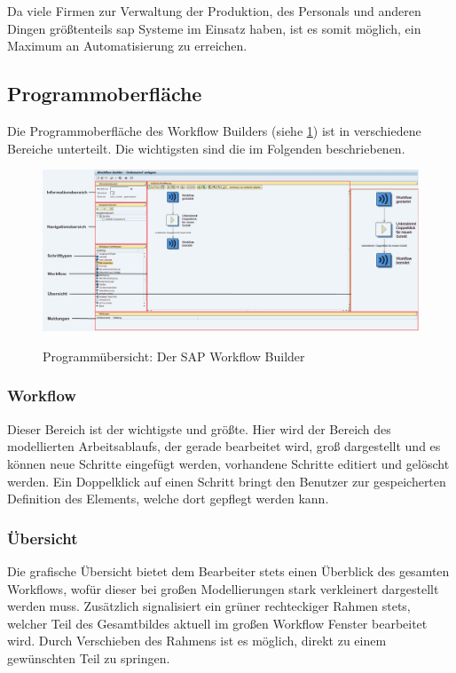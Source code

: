 Da viele Firmen zur Verwaltung der Produktion, des Personals und anderen Dingen größtenteils \gls{sap} Systeme im Einsatz haben, ist es somit möglich, ein Maximum an Automatisierung zu erreichen.

\subsection{Programmoberfläche}
\label{sec:win-overwiev}
Die Programmoberfläche des Workflow Builders (siehe \ref{abb:workflow-overview}) ist in verschiedene Bereiche unterteilt. Die wichtigsten sind die im Folgenden beschriebenen.

\begin{figure}[h]
	\begin{center}
	\includegraphics[width=1.0\textwidth]{grafiken/wf-builder_overview.png}
	\caption{Programmübersicht: Der SAP Workflow Builder}
	\vspace{-10pt}
	\label{abb:workflow-overview}
	\end{center}
\end{figure}

\subsubsection{Workflow}
\label{sec:win-overview-wf}
Dieser Bereich ist der wichtigste und größte. Hier wird der Bereich des modellierten Arbeitsablaufs, der gerade bearbeitet wird, groß dargestellt und es können neue Schritte eingefügt werden, vorhandene Schritte editiert und gelöscht werden. Ein Doppelklick auf einen Schritt bringt den Benutzer zur gespeicherten Definition des Elements, welche dort gepflegt werden kann.

\subsubsection{Übersicht}
\label{sec:win-overview-uebersicht}
Die grafische Übersicht bietet dem Bearbeiter stets einen Überblick des gesamten Workflows, wofür dieser bei großen Modellierungen stark verkleinert dargestellt werden muss. Zusätzlich signalisiert ein grüner rechteckiger Rahmen stets, welcher Teil des Gesamtbildes aktuell im großen Workflow Fenster bearbeitet wird. Durch Verschieben des Rahmens ist es möglich, direkt zu einem gewünschten Teil zu springen.

